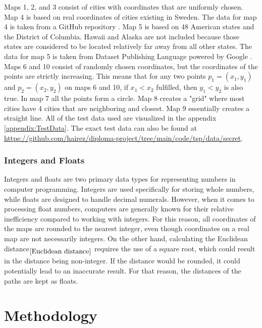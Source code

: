 \documentclass{article}
\begin{document}
\noindent
Maps 1, 2, and 3 consist of cities with coordinates that are uniformly chosen. Map 4 is based on real coordinates of cities existing in Sweden. The data for map 4 is taken from a GitHub repository \cite{SwedishCities}. Map 5 is based on 48 American states and the District of Columbia. Hawaii and Alaska are not included because those states are considered to be located relatively far away from all other states. The data for map 5 is taken from Dataset Publishing Language powered by Google \cite{DatasetUSA}. Maps 6 and 10 consist of randomly chosen coordinates, but the coordinates of the points are strictly increasing. This means that for any two points $p_1 = (x_1,y_1)$ and $p_2=(x_2,y_2)$ on maps 6 and 10, if $x_1 < x_2$ fulfilled, then $y_1 < y_2$ is also true. In map 7 all the points form a circle. Map 8 creates a "grid" where most cities have 4 cities that are neighboring and closest. Map 9 essentially creates a straight line. All of the test data used are visualized in the appendix \ref{appendix:TestData}. The exact test data can also be found at \href{https://github.com/hairez/diploma-project/tree/main/code/tsp/data/secret}{https://github.com/hairez/diploma-project/tree/main/code/tsp/data/secret}.



\subsubsection{Integers and Floats}\label{Int VS Float}
Integers and floats are two primary data types for representing numbers in computer programming. Integers are used specifically for storing whole numbers, while floats are designed to handle decimal numerals. However, when it comes to processing float numbers, computers are generally known for their relative inefficiency compared to working with integers. For this reason, all coordinates of the maps are rounded to the nearest integer, even though coordinates on a real map are not necessarily integers. On the other hand, calculating the Euclidean distance$_{\ref{Euclidean distance}}$ requires the use of a square root, which could result in the distance being non-integer. If the distance would be rounded, it could potentially lead to an inaccurate result. For that reason, the distances of the paths are kept as floats. 




\section{Methodology}\label{Methodology}
\end{document}
